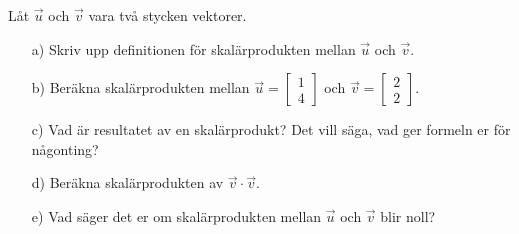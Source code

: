 Låt $\vec{u}$ och $\vec{v}$ vara två stycken vektorer.
\begin{itemize}
\item[a) ] Skriv upp definitionen för skalärprodukten mellan $\vec{u}$ och $\vec{v}$.
\item[b) ] Beräkna skalärprodukten mellan $\vec{u} = \begin{bmatrix} 1 \\ 4 \end{bmatrix}$ och $\vec{v} = \begin{bmatrix} 2 \\ 2 \end{bmatrix}.$
\item[c) ] Vad är resultatet av en skalärprodukt? Det vill säga, vad ger formeln er för någonting?
\item[d) ] Beräkna skalärprodukten av $\vec{v} \cdot \vec{v}$.
\item[e) ] Vad säger det er om skalärprodukten mellan $\vec{u}$ och $\vec{v}$ blir noll?
\end{itemize}
